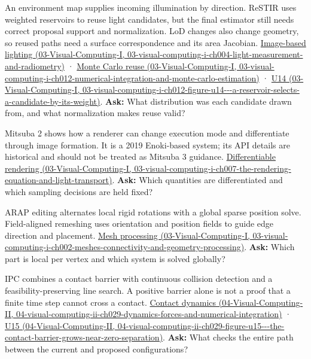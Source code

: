 An environment map supplies incoming illumination by direction. ReSTIR uses weighted reservoirs to reuse light candidates, but the final estimator still needs correct proposal support and normalization. LoD changes also change geometry, so reused paths need a surface correspondence and its area Jacobian. \href{../03-Visual-Computing-I/main.pdf\#nameddest=03-visual-computing-i-ch004-light-measurement-and-radiometry}{Image-based lighting (03-Visual-Computing-I, 03-visual-computing-i-ch004-light-measurement-and-radiometry)} · \href{../03-Visual-Computing-I/main.pdf\#nameddest=03-visual-computing-i-ch012-numerical-integration-and-monte-carlo-estimation}{Monte Carlo reuse (03-Visual-Computing-I, 03-visual-computing-i-ch012-numerical-integration-and-monte-carlo-estimation)} · \href{../03-Visual-Computing-I/main.pdf\#nameddest=03-visual-computing-i-ch012-figure-u14---a-reservoir-selects-a-candidate-by-its-weight}{U14 (03-Visual-Computing-I, 03-visual-computing-i-ch012-figure-u14-\/-\/-a-reservoir-selects-a-candidate-by-its-weight)}. \textbf{Ask:} What distribution was each candidate drawn from, and what normalization makes reuse valid?

Mitsuba 2 shows how a renderer can change execution mode and differentiate through image formation. It is a 2019 Enoki-based system; its API details are historical and should not be treated as Mitsuba 3 guidance. \href{../03-Visual-Computing-I/main.pdf\#nameddest=03-visual-computing-i-ch007-the-rendering-equation-and-light-transport}{Differentiable rendering (03-Visual-Computing-I, 03-visual-computing-i-ch007-the-rendering-equation-and-light-transport)}. \textbf{Ask:} Which quantities are differentiated and which sampling decisions are held fixed?

ARAP editing alternates local rigid rotations with a global sparse position solve. Field-aligned remeshing uses orientation and position fields to guide edge direction and placement. \href{../03-Visual-Computing-I/main.pdf\#nameddest=03-visual-computing-i-ch002-meshes-connectivity-and-geometry-processing}{Mesh processing (03-Visual-Computing-I, 03-visual-computing-i-ch002-meshes-connectivity-and-geometry-processing)}. \textbf{Ask:} Which part is local per vertex and which system is solved globally?

IPC combines a contact barrier with continuous collision detection and a feasibility-preserving line search. A positive barrier alone is not a proof that a finite time step cannot cross a contact. \href{../04-Visual-Computing-II/main.pdf\#nameddest=04-visual-computing-ii-ch029-dynamics-forces-and-numerical-integration}{Contact dynamics (04-Visual-Computing-II, 04-visual-computing-ii-ch029-dynamics-forces-and-numerical-integration)} · \href{../04-Visual-Computing-II/main.pdf\#nameddest=04-visual-computing-ii-ch029-figure-u15---the-contact-barrier-grows-near-zero-separation}{U15 (04-Visual-Computing-II, 04-visual-computing-ii-ch029-figure-u15-\/-\/-the-contact-barrier-grows-near-zero-separation)}. \textbf{Ask:} What checks the entire path between the current and proposed configurations?

